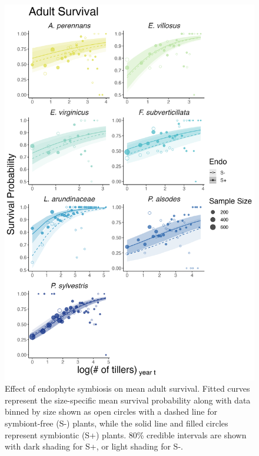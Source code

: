 \documentclass[9pt,twoside,lineno]{pnas-new}
\begin{document}
\begin{figure}
	\centering
	\includegraphics[width=.6\linewidth]{surv_meanplot.png}
	\caption{Effect of endophyte symbiosis on mean adult survival. Fitted curves represent the size-specific mean survival probability along with data binned by size shown as open circles with a dashed line for symbiont-free (S-) plants, while the solid line and filled circles represent symbiontic (S+) plants. 80\% credible intervals are shown with dark shading for  S+, or light shading for S-.}
\end{figure}

\newpage
\end{document}
